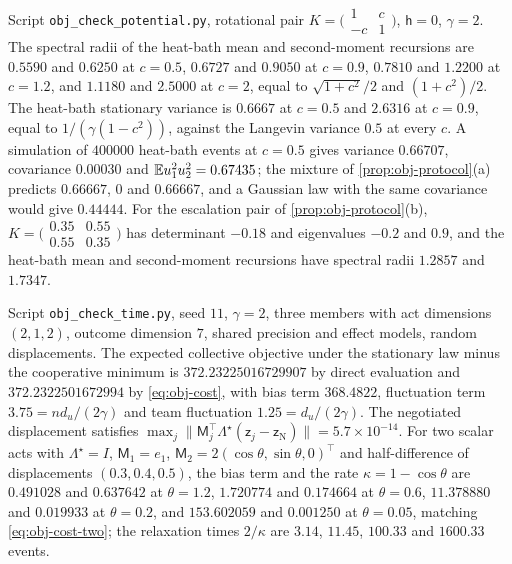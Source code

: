 \begin{numcheck}\label{chk:obj-protocol}
Script \texttt{obj\_\allowbreak check\_\allowbreak potential.py}, rotational pair $K=\bigl(\begin{smallmatrix}1&c\\-c&1\end{smallmatrix}\bigr)$, $\mathsf h=0$, $\gamma=2$. The spectral radii of the heat-bath mean and second-moment recursions are $0.5590$ and $0.6250$ at $c=0.5$, $0.6727$ and $0.9050$ at $c=0.9$, $0.7810$ and $1.2200$ at $c=1.2$, and $1.1180$ and $2.5000$ at $c=2$, equal to $\sqrt{1+c^2}/2$ and $(1+c^2)/2$. The heat-bath stationary variance is $0.6667$ at $c=0.5$ and $2.6316$ at $c=0.9$, equal to $1/(\gamma(1-c^2))$, against the Langevin variance $0.5$ at every $c$. A simulation of $400000$ heat-bath events at $c=0.5$ gives variance $0.66707$, covariance $0.00030$ and $\mathbb{E} u_1^2u_2^2=0.67435$; the mixture of \cref{prop:obj-protocol}(a) predicts $0.66667$, $0$ and $0.66667$, and a Gaussian law with the same covariance would give $0.44444$. For the escalation pair of \cref{prop:obj-protocol}(b), $K=\bigl(\begin{smallmatrix}0.35&0.55\\0.55&0.35\end{smallmatrix}\bigr)$ has determinant $-0.18$ and eigenvalues $-0.2$ and $0.9$, and the heat-bath mean and second-moment recursions have spectral radii $1.2857$ and $1.7347$.
\end{numcheck}

\begin{numcheck}\label{chk:obj-cost}
Script \texttt{obj\_\allowbreak check\_\allowbreak time.py}, seed $11$, $\gamma=2$, three members with act dimensions $(2,1,2)$, outcome dimension $7$, shared precision and effect models, random displacements. The expected collective objective under the stationary law minus the cooperative minimum is $372.23225016729907$ by direct evaluation and $372.2322501672994$ by \eqref{eq:obj-cost}, with bias term $368.4822$, fluctuation term $3.75=nd_u/(2\gamma)$ and team fluctuation $1.25=d_u/(2\gamma)$. The negotiated displacement satisfies $\max_j\lVert\mathsf M_j^\top\Lambda^\star(\mathsf z_j-\mathsf z_{\mathrm N})\rVert=5.7\times10^{-14}$. For two scalar acts with $\Lambda^\star=I$, $\mathsf M_1=e_1$, $\mathsf M_2=2(\cos\theta,\sin\theta,0)^\top$ and half-difference of displacements $(0.3,0.4,0.5)$, the bias term and the rate $\kappa=1-\cos\theta$ are $0.491028$ and $0.637642$ at $\theta=1.2$, $1.720774$ and $0.174664$ at $\theta=0.6$, $11.378880$ and $0.019933$ at $\theta=0.2$, and $153.602059$ and $0.001250$ at $\theta=0.05$, matching \eqref{eq:obj-cost-two}; the relaxation times $2/\kappa$ are $3.14$, $11.45$, $100.33$ and $1600.33$ events.
\end{numcheck}

